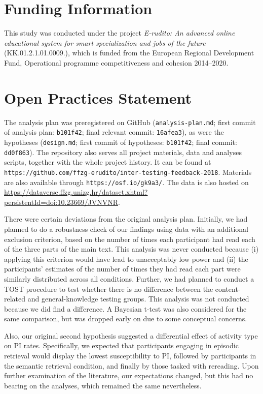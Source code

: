 \documentclass[12pt]{article}
\begin{document}
\section{Funding Information}

This study was conducted under the project \textit{E-rudito: An
advanced online educational system for smart specialization and jobs of the
future} (KK.01.2.1.01.0009.), which is funded from the European Regional
Development Fund, Operational programme competitiveness and cohesion 2014--2020.

\section{Open Practices Statement}

The analysis plan was preregistered on GitHub (\texttt{analysis-plan.md};
first commit of analysis plan: \texttt{b101f42}; final relevant commit:
\texttt{16afea3}), as were the hypotheses (\texttt{design.md}; first commit of hypotheses:
\texttt{b101f42}; final commit: \texttt{dd0f863}).  The repository also serves all
project materials, data and analyses scripts, together with the whole project
history. It can be found at
\texttt{https://github.com/ffzg-erudito/inter-testing-feedback-2018}.
Materials are also available through \texttt{https://osf.io/gk9a3/}. The data
is also hosted on
\url{https://dataverse.ffzg.unizg.hr/dataset.xhtml?persistentId=doi:10.23669/JVNVNR}.

There were certain deviations from the original analysis plan.
Initially, we had planned to do a robustness check of our findings using
data with an additional exclusion criterion, based on the number of times
each participant had read each of the three parts of the main text. This analysis
was never conducted because (i) applying this criterion would have lead to
unacceptably low power and (ii) the participants' estimates of the number
of times they had read each part were similarly distributed across all conditions.
Further, we had planned to conduct a TOST procedure to test whether there is
no difference between the content-related and general-knowledge testing
groups. This analysis was not conducted because we did find a difference.
A Bayesian t-test was also considered for the same comparison, but was dropped
early on due to some conceptual concerns.

Also, our original second
hypothesis suggested a differential effect of 
activity type on PI rates. 
Specifically, we expected that participants engaging 
in episodic retrieval 
would display the lowest susceptibility to PI, 
followed by participants in 
the semantic retrieval condition, and finally by 
those tasked with 
rereading. Upon further examination of the literature, 
our expectations 
changed, but this had no bearing on the analyses, 
which remained the same 
nevertheless.

\clearpage

{}


\end{document}

